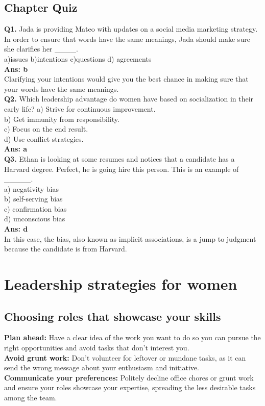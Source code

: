 \documentclass[12pt]{article}
\begin{document}
\subsection{Chapter Quiz}
\textbf{Q1.}  Jada is providing Mateo with updates on a social media marketing strategy. In order to ensure that words have the same meanings, Jada should make sure she clarifies her \_\_\_\_.\\
a)issues b)intentions c)questions d) agreements\\
\textbf{Ans: b}\\
Clarifying your intentions would give you the best chance in making sure that your words have the same meanings.\\
\textbf{Q2.} Which leadership advantage do women have based on socialization in their early life?
a) Strive for continuous improvement.\\
b) Get immunity from responsibility.\\
c) Focus on the end result.\\
d) Use conflict strategies.\\
\textbf{Ans: a}\\
\textbf{Q3.} Ethan is looking at some resumes and notices that a candidate has a Harvard degree. Perfect, he is going hire this person. This is an example of \_\_\_\_\_.\\
a) negativity bias \\
b) self-serving bias \\
c) confirmation bias\\
d) unconscious bias\\
\textbf{Ans: d}\\
In this case, the bias, also known as implicit associations, is a jump to judgment because the candidate is from Harvard.

\section{ Leadership strategies for women}

\subsection{Choosing roles that showcase your skills}
\textbf{Plan ahead:} Have a clear idea of the work you want to do so you can pursue the right opportunities and avoid tasks that don't interest you.\\
\textbf{Avoid grunt work:} Don't volunteer for leftover or mundane tasks, as it can send the wrong message about your enthusiasm and initiative.\\
\textbf{Communicate your preferences:} Politely decline office chores or grunt work and ensure your roles showcase your expertise, spreading the less desirable tasks among the team.
\end{document}
